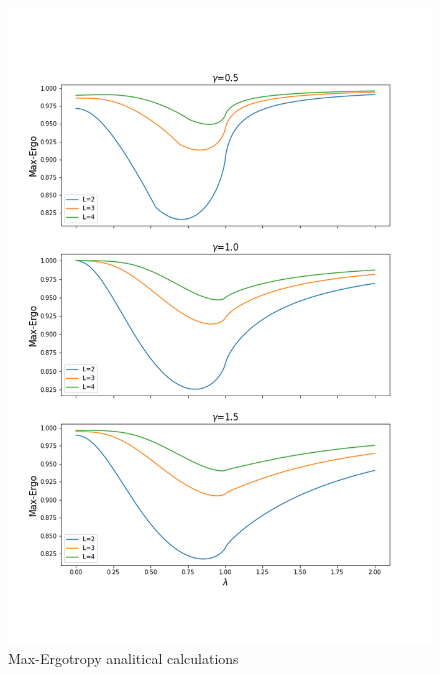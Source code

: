 \documentclass[12pt,a4paper]{book}
\theoremstyle{definition}
\begin{document}
\begin{figure}
		\centering
		\includegraphics[width=\linewidth]{graphs/Maxerg_234_3gammas}
		\caption{Max-Ergotropy analitical calculations}
		\label{fig:maxerg2343gammas}
\end{figure}
\end{document}
